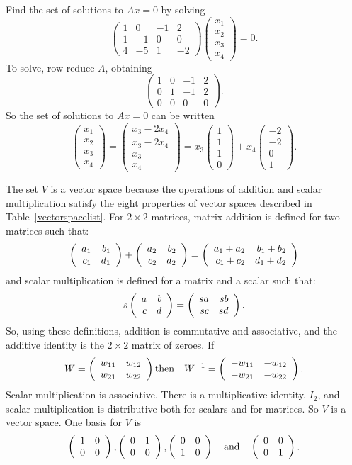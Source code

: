 \soln Find the set of solutions to $Ax = 0$ by solving
\[
\left(\begin{array}{rrrr} 1 & 0 & -1 & 2 \\ 1 & -1 & 0 & 0 \\ 4
& -5 & 1 & -2 \end{array}\right) \left(\begin{array}{r} x_1 \\ x_2
\\ x_3 \\ x_4 \end{array}\right) = 0.
\]
To solve, row reduce $A$, obtaining
\[
\left(\begin{array}{rrrr} 1 & 0 & -1 & 2 \\ 0 & 1 & -1 & 2 \\ 0
& 0 & 0 & 0 \end{array}\right).
\]
So the set of solutions to $Ax = 0$ can be written
\[
\left(\begin{array}{r} x_1 \\ x_2 \\ x_3 \\ x_4
\end{array}\right) = \left(\begin{array}{c} x_3 - 2x_4 \\ x_3 - 2x_4
\\ x_3 \\ x_4 \end{array}\right) = x_3\left(\begin{array}{r} 1 \\ 1
\\ 1 \\ 0 \end{array}\right) + x_4\left(\begin{array}{r} -2 \\ -2
\\ 0 \\ 1 \end{array}\right).
\]

The set $V$ is a vector space because the operations of addition and
scalar multiplication satisfy the eight properties of
vector spaces described in Table~\ref{vectorspacelist}.  For $2 \times
2$ matrices, matrix addition is defined for two matrices such that:
\[
\left(\begin{array}{rr} a_1 & b_1\\ c_1 &d_1\end{array}\right) + \left(\begin{array}{rr} a_2 & b_2\\ c_2 &d_2\end{array}\right) =
\left(\begin{array}{rr} a_1 + a_2 & b_1 + b_2\\ c_1 + c_2 &d_1 + d_2\end{array}\right)
\]
and scalar multiplication is defined for a matrix and a scalar such that:
\[
s\left(\begin{array}{rr} a & b\\ c &d\end{array}\right) = \left(\begin{array}{rr} sa & sb\\ sc &sd\end{array}\right).
\]
So, using these definitions, addition is commutative and associative,
and the additive identity is the $2 \times 2$ matrix of zeroes.  If
\[
W = \left(\begin{array}{rr} w_{11} & w_{12}\\ w_{21} &w_{22}\end{array}\right) \mbox{then}
\quad W^{-1} = \left(\begin{array}{rr} -w_{11} & -w_{12}\\ -w_{21} &-w_{22}\end{array}\right).
\]
Scalar multiplication is associative.  There is a multiplicative
identity, $I_2$, and scalar multiplication is distributive both
for scalars and for matrices.  So $V$ is a vector space.  One basis
for $V$ is
\[
\left(\begin{array}{rr} 1 & 0\\ 0 &0\end{array}\right), \left(\begin{array}{rr} 0 & 1\\ 0 &0\end{array}\right), \left(\begin{array}{rr} 0 & 0\\ 1 &0\end{array}\right)
\quad\mbox{and}\quad \left(\begin{array}{rr} 0 & 0\\ 0 &1\end{array}\right).
\]

